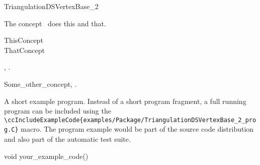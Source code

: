 

\begin{ccRefConcept}{TriangulationDSVertexBase_2}


\ccDefinition
  
The concept \ccRefName\ does this and that.

\ccGeneralizes

ThisConcept \\
ThatConcept

\ccTypes


\ccCreation
{}  %


\ccOperations


\ccHasModels

,
.

\ccSeeAlso

Some\_other\_concept,
.

\ccExample

A short example program.
Instead of a short program fragment, a full running program can be
included using the 
\verb|\ccIncludeExampleCode{examples/Package/TriangulationDSVertexBase_2_prog.C}| 
macro. The program example would be part of the source code distribution and
also part of the automatic test suite.

\begin{ccExampleCode}
void your_example_code() {
}
\end{ccExampleCode}


\end{ccRefConcept}



